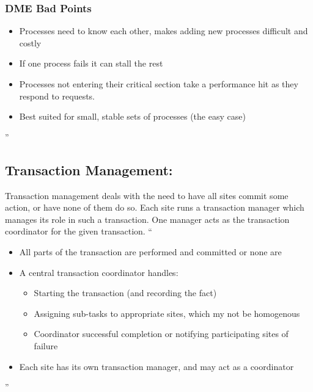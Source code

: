 \documentclass[11pt]{article}
\begin{document}
	
\subsubsection{DME Bad Points}
\begin{itemize}
\item Processes need to know each other, makes adding new processes difficult and costly
\item If one process fails it can stall the rest
\item Processes not entering their critical section take a performance hit as they respond to requests.
\item Best suited for small, stable sets of processes (the easy case)
\end{itemize}
''
	
\subsection{Transaction Management:}
Transaction management deals with the need to have all sites commit some action, or have none of them do so.  Each site runs a transaction manager which manages its role in such a transaction.  One manager acts as the transaction coordinator for the given transaction.  
``\begin{itemize}
\item All parts of the transaction are performed and committed or none are
\item A central transaction coordinator handles:
\begin{itemize}
\item Starting the transaction (and recording the fact)
\item Assigning sub-tasks to appropriate sites, which my not be homogenous
\item Coordinator successful completion or notifying participating sites of failure
\end{itemize}
\item Each site has its own transaction manager, and may act as a coordinator
\end{itemize}''
	
	

		
\end{document}
